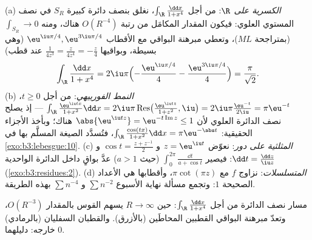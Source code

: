 \begin{example}
\label{ex:b3:residues:integrals}
(a) \emph{الكسرية على $\R$}: من أجل $\int_\R\frac{\dd x}{1 +
x^4}$، نغلق بنصف دائرة
كبيرة $S_R$ في نصف المستوي العلوي: فيكون المقدار المكامَل من
رتبة $O(R^{-4})$ هناك، ومنه $\int_{S_R} \to 0$ (بمتراجحة $ML$)، وتعطي
مبرهنة البواقي مع الأقطاب $\eu^{\iu\pi/4}, \eu^{3\iu\pi/4}$ (وهي بسيطة، وبواقيها $\frac1{4z^3} = \frac{z}{4z^4} = -\frac z4$
عند قطب)
\[
\int_\R\frac{\dd x}{1 + x^4}
= 2\iu\pi\Bigl(-\frac{\eu^{\iu\pi/4}}4 -
\frac{\eu^{3\iu\pi/4}}4\Bigr)
= \frac{\pi}{\sqrt2} .
\]
(b) \emph{النمط الفورييهي}: من أجل $t \geq 0$، $\int_\R\frac{\eu^{\iu tx}}{1 + x^2}\dd x =
2\iu\pi\operatorname{Res}\bigl(\tfrac{\eu^{\iu tz}}{1+z^2},
\iu\bigr) = 2\iu\pi\frac{\eu^{-t}}{2\iu} = \pi\eu^{-t}$ --- إذ
يصلح نصف الدائرة العلوي لأن $\abs{\eu^{\iu tz}} =
\eu^{-t\operatorname{Im}z} \leq 1$ هناك؛ وبأخذ الأجزاء
الحقيقية: $\int_\R\frac{\cos(tx)}{1+x^2}\dd x = \pi\eu^{-\abs t}$، فتُسدَّد الصيغة المسلَّم بها في \cref{exo:b3:lebesgue:10}.
(c) \emph{المثلثية على دور}: نعوّض $z =
\eu^{\iu t}$ و $\cos t = \frac{z + z^{-1}}2$ و $\dd t =
\frac{\dd z}{\iu z}$:
فيصير $\int_0^{2\pi}\frac{\dd t}{a + \cos t}$ (حيث $a > 1$) عدَّ بواقٍ داخل الدائرة الواحدية
(\cref{exo:b3:residues:2}).
(d) \emph{المتسلسلات}: نزاوج $f$ مع $\pi\cot(\pi z)$، وأقطابها
هي الأعداد الصحيحة  $1$: وتجمع مسألة نهاية الأسبوع
$\sum n^{-2}$ و $\sum n^{-4}$ بهذه الطريقة.
\end{example}

\begin{omfigure}

{\small مسار نصف الدائرة من أجل $\int_\R\frac{\dd x}{1 +
x^4}$: حين $R \to \infty$
يسهم القوس بالمقدار $O(R^{-3})$، وتعدّ مبرهنة البواقي القطبين
المحاطَين (بالأزرق). والقطبان السفليان (بالرمادي) خارجه:
دليلهما $0$.}
\end{omfigure}

